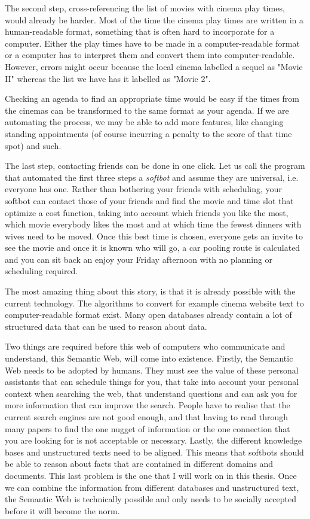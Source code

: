 \documentclass{article}
\begin{document}
 The second step, cross-referencing the list of movies with cinema play times, would already be harder. Most of the time the cinema play times are written in a human-readable format, something that is often hard to incorporate for a computer. Either the play times have to be made in a computer-readable format or a computer has to interpret them and convert them into computer-readable. However, errors might occur because the local cinema labelled a sequel as "Movie II" whereas the list we have has it labelled as "Movie 2".
 
 Checking an agenda to find an appropriate time would be easy if the times from the cinemas can be transformed to the same format as your agenda. If we are automating the process, we may be able to add more features, like changing standing appointments (of course incurring a penalty to the score of that time spot) and such.
 
 The last step, contacting friends can be done in one click. Let us call the program that automated the first three steps a \emph{softbot} and assume they are universal, i.e. everyone has one. Rather than bothering your friends with scheduling, your softbot can contact those of your friends and find the movie and time slot that optimize a cost function, taking into account which friends you like the most, which movie everybody likes the most and at which time the fewest dinners with wives need to be moved. Once this best time is chosen, everyone gets an invite to see the movie and once it is known who will go, a car pooling route is calculated and you can sit back an enjoy your Friday afternoon with no planning or scheduling required.
 
 The most amazing thing about this story, is that it is already possible with the current technology. The algorithms to convert for example cinema website text to computer-readable format exist. Many open databases already contain a lot of structured data that can be used to reason about data.
 
 Two things are required before this web of computers who communicate and understand, this Semantic Web, will come into existence. 
 Firstly, the Semantic Web needs to be adopted by humans. They must see the value of these personal assistants that can schedule things for you, that take into account your personal context when searching the web, that understand questions and can ask you for more information that can improve the search. People have to realise that the current search engines are not good enough, and that having to read through many papers to find the one nugget of information or the one connection that you are looking for is not acceptable or necessary.
 Lastly, the different knowledge bases and unstructured texts need to be aligned. This means that softbots should be able to reason about facts that are contained in different domains and documents. This last problem is the one that I will work on in this thesis. Once we can combine the information from different databases and unstructured text, the Semantic Web is technically possible and only needs to be socially accepted before it will become the norm.
\end{document}
